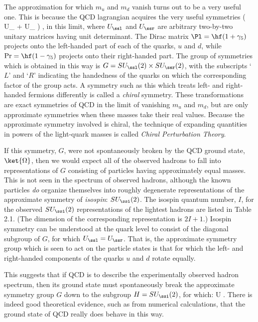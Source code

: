\documentclass[12pt,epsf]{report}
\begin{document}
The approximation for which $m_u$ and $m_d$ vanish turns
out to be a very useful one. This is because the QCD
lagrangian acquires the very useful symmetries
%
\eq
\label{chiralsym}
 \to \Bigl( U_\ssl \; \Pl + 
U_\ssr \; \Pr \Bigr) \;
,
\eeq
%
in this limit, where $U_\ssl$ and $U_\ssr$ are arbitrary
two-by-two unitary matrices having unit determinant. The
Dirac matrix $\Pl = \hf(1+ \gamma_5)$ projects onto the 
left-handed part of each of the quarks, $u$ and $d$, 
while $\Pr = \hf(1
- \gamma_5)$ projects onto their right-handed part. The
group of symmetries which is obtained in this way is $G =
SU_\ssl(2) \times 
SU_\ssr(2)$, with the subscripts `$L$' and `$R$' indicating
the handedness of the quarks on which the corresponding
factor of the group acts. A symmetry such as this which
treats left- and right-handed fermions differently is
called a {\em chiral} symmetry. These transformations are
exact symmetries of QCD in the limit of vanishing $m_u$ and
$m_d$, but are only approximate symmetries when these masses
take their real values. Because the approximate symmetry
involved is chiral, the technique of expanding quantities
in powers of the light-quark masses is called {\em Chiral
Perturbation Theory}.

If this symmetry, $G$, were not spontaneously broken by the
QCD ground state, $\ket{\Omega}$, then we would expect all
of the observed hadrons to fall into representations of $G$
consisting of particles having approximately equal masses.
This is not seen in the spectrum of observed hadrons,
although the known particles 
{\em do} organize themselves into roughly degenerate
representations of the approximate symmetry of {\em
isospin}: $SU_\ssi(2)$. The isospin quantum number, $I$,
for the observed $SU_\ssi(2)$ representations of the
lightest hadrons are listed in Table 2.1. (The dimension of
the corresponding representation is $2I+1$.) Isospin
symmetry can be understood at the quark level to consist of
the diagonal subgroup of $G$, for which $U_\ssl = U_\ssr$.
That is, the approximate symmetry group which is seen to
act on the particle states is that for which the left- and
right-handed components of the quarks $u$ and $d$ rotate
equally.

This suggests that if QCD is to describe the experimentally
observed hadron spectrum, then its ground state must
spontaneously break the approximate symmetry group $G$ down
to the subgroup $H = SU_\ssi(2)$, for which:
%
\eq
\label{isospintrans}
 \to U \; .  \eeq
%
There is indeed good theoretical evidence, such as from
numerical calculations, that the ground state of QCD really
does behave in this way.
\end{document}
